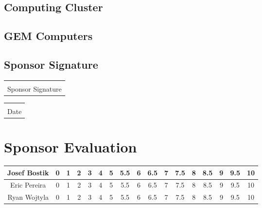 \documentclass[12pt]{article}
\makeatletter
\newcommand{\titledate}[2][2.5in]{%
	\noindent%
	\begin{tabular}{@{}p{#1}@{}}
		\\ \hline \\[-.75\normalbaselineskip]
		#2
	\end{tabular} \hspace{1in}
	\begin{tabular}{@{}p{#1}@{}}
		\\ \hline \\[-.75\normalbaselineskip]
		Date
	\end{tabular}
}
\makeatother
\begin{document}
\vspace{1in}

\subsection{Computing Cluster}

\vspace{1in}

\subsection{GEM Computers}

\vspace{1in}

\newpage

\subsection{Sponsor Signature}
\vspace{.5in}
 \titledate{Sponsor Signature}
 
\section{Sponsor Evaluation}
\begin{tabular}{|c|c|c|c|c|c|c|c|c|c|c|c|c|c|c|c|c|}
	\hline
	Josef Bostik & 0 & 1 & 2 & 3 & 4 & 5 & 5.5 & 6 & 6.5 & 7 & 7.5 & 8 & 8.5 & 9 & 9.5 & 10\\
	\hline
	Eric Pereira & 0 & 1 & 2 & 3 & 4 & 5 & 5.5 & 6 & 6.5 & 7 & 7.5 & 8 & 8.5 & 9 & 9.5 & 10\\
	\hline
	Ryan Wojtyla & 0 & 1 & 2 & 3 & 4 & 5 & 5.5 & 6 & 6.5 & 7 & 7.5 & 8 & 8.5 & 9 & 9.5 & 10\\
	\hline
\end{tabular}
\end{document}
